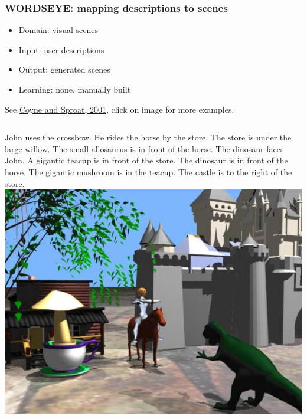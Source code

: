 \documentclass[ignorenonframetext]{beamer}
\begin{document}
\begin{frame}\frametitle{WORDSEYE: mapping descriptions to scenes}

\begin{itemize}
\item Domain: visual scenes
\item Input: user descriptions
\item Output: generated scenes
\item Learning: none, manually built
\end{itemize}

See \href{http://www1.cs.columbia.edu/~coyne/papers/wordseye_siggraph.pdf}{Coyne and Sproat, 2001}, click on image for more examples.

\begin{columns}[c]
\scriptsize
John uses the crossbow. He rides the horse by the store.
The store is under the large willow. The small allosaurus is in front
of the horse. The dinosaur faces John. A gigantic teacup is in front
of the store. The dinosaur is in front of the horse. The gigantic
mushroom is in the teacup. The castle is to the right of the store.
\href{http://www.wordseye.com}{
\includegraphics[height=.6\textwidth]{images/coyne-wordseye.png}}
\end{columns}
\end{frame}
\end{document}
